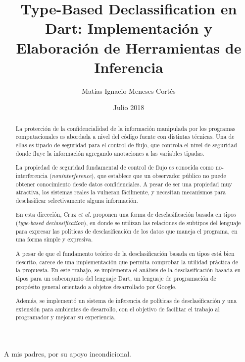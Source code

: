 \documentclass[upright, contnum]{umemoria}
\author{Matías Ignacio Meneses Cortés}
\title{Type-Based Declassification en Dart: Implementación y Elaboración de Herramientas de Inferencia}
\date{Julio 2018}
\begin{document}
\setcounter{chapter}{1}
\frontmatter
\maketitle

\begin{abstract}
	La protección de la confidencialidad de la información manipulada por los programas computacionales es abordada a nivel del código fuente con distintas técnicas. Una de ellas es tipado de seguridad para el control de flujo, que controla el nivel de seguridad donde fluye la información agregando anotaciones a las variables tipadas.

	La propiedad de seguridad fundamental de control de flujo es conocida como no-interferencia (\emph{noninterference}), que establece que un observador público no puede obtener conocimiento desde datos confidenciales. A pesar de ser una propiedad muy atractiva, los sistemas reales la vulneran fácilmente, y necesitan mecanismos para desclasificar selectivamente alguna información.

	En esta dirección, Cruz \textit{et al.} proponen una forma de desclasificación basada en tipos (\emph{type-based declassification}), en donde se utilizan las relaciones de subtipos del lenguaje para expresar las políticas de desclasificación de los datos que maneja el programa, en una forma simple y expresiva.

	A pesar de que el fundamento teórico de la desclasificación basada en tipos está bien descrito, carece de una implementación que permita comprobar la utilidad práctica de la propuesta. En este trabajo, se implementa el análisis de la desclasificación basada en tipos para un subconjunto del lenguaje Dart, un lenguaje de programación de propósito general orientado a objetos desarrollado por Google.

	Además, se implementó un sistema de inferencia de políticas de desclasificación y una extensión para ambientes de desarrollo, con el objetivo de facilitar el trabajo al programador y mejorar su experiencia.
\end{abstract}

\begin{dedicatoria} %
A mis padres, por su apoyo incondicional.
\end{dedicatoria}

\cleardoublepage

\tableofcontents

\mainmatter














\end{document}
